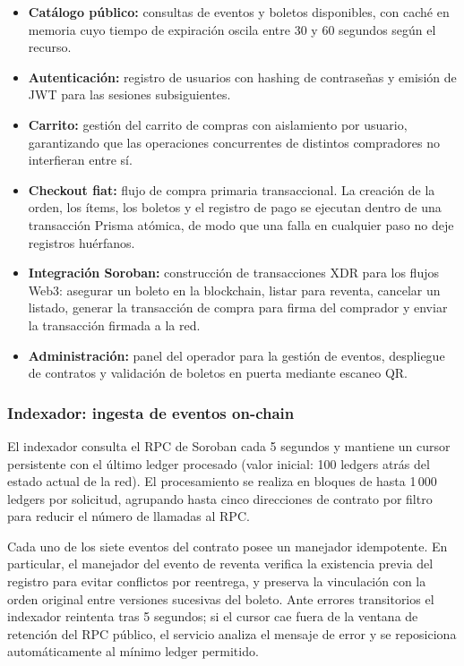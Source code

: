 \begin{itemize}\setlength{\itemsep}{2pt}
    \item \textbf{Catálogo público:} consultas de eventos y boletos disponibles, con caché en memoria cuyo
tiempo de expiración oscila entre 30 y 60 segundos según el recurso.

    \item \textbf{Autenticación:} registro de usuarios con hashing de contraseñas y emisión de JWT para las
sesiones subsiguientes.

    \item \textbf{Carrito:} gestión del carrito de compras con aislamiento por usuario, garantizando que las
operaciones concurrentes de distintos compradores no interfieran entre sí.

    \item \textbf{Checkout fiat:} flujo de compra primaria transaccional. La creación de la orden, los ítems,
los boletos y el registro de pago se ejecutan dentro de una transacción Prisma atómica, de modo que una falla
en cualquier paso no deje registros huérfanos.



    \item \textbf{Integración Soroban:} construcción de transacciones XDR para los flujos Web3: asegurar un
boleto en la blockchain, listar para reventa, cancelar un listado, generar la transacción de compra para
firma del comprador y enviar la transacción firmada a la red.

    \item \textbf{Administración:} panel del operador para la gestión de eventos, despliegue de contratos y
validación de boletos en puerta mediante escaneo QR.
\end{itemize}

\subsubsection{Indexador: ingesta de eventos on-chain}

El indexador consulta el RPC de Soroban cada 5 segundos y mantiene un cursor persistente con el último ledger
procesado (valor inicial: 100 ledgers atrás del estado actual de la red). El procesamiento se realiza en
bloques de hasta 1\,000 ledgers por solicitud, agrupando hasta cinco direcciones de contrato por filtro para
reducir el número de llamadas al RPC.

Cada uno de los siete eventos del contrato posee un manejador idempotente. En particular, el manejador del
evento de reventa verifica la existencia previa del registro para evitar conflictos por reentrega, y preserva
la vinculación con la orden original entre versiones sucesivas del boleto. Ante errores transitorios el
indexador reintenta tras 5 segundos; si el cursor cae fuera de la ventana de retención del RPC público, el
servicio analiza el mensaje de error y se reposiciona automáticamente al mínimo ledger permitido.

